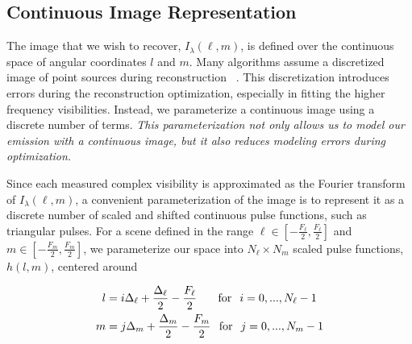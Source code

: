 \subsection{Continuous Image Representation}


The image that we wish to recover, $I_{\lambda}(\ell,m)$, is defined over the continuous space of angular coordinates $l$ and $m$. 
Many algorithms assume a discretized image of point sources during reconstruction 
~\cite{taylor1999synthesis}. This discretization introduces errors during the reconstruction optimization, especially in fitting the higher frequency visibilities.
Instead, we parameterize a continuous image using a discrete number of terms. 
{\it This parameterization not only allows us to model our emission with a continuous image, but it also reduces modeling errors during optimization. }

Since each measured complex visibility is approximated as the Fourier transform of $I_{\lambda}(\ell,m)$, a convenient parameterization of the image is to represent it as a discrete number of scaled and shifted continuous pulse functions, such as triangular pulses.
For a scene defined in the range $\ell \in [-\frac{F_\ell}{2}, \frac{F_\ell}{2}]$ and $m \in [-\frac{F_m}{2}, \frac{F_m}{2}]$,
we parameterize our space into $N_\ell \times N_m$ scaled pulse functions, $h(l,m)$, centered around 


\begin{align}
 l &= i \Delta_{\ell} + \frac{\Delta_{\ell}}{2}  -\frac{F_\ell}{2} \hspace{0.26in} \mbox{for} \hspace{0.1 in} i = 0,...,N_\ell-1
 \label{eq:discrete1}
\\m &= j\Delta_m + \frac{\Delta_m}{2} -\frac{F_m}{2} \hspace{0.1in} \mbox{for} \hspace{0.1 in} j= 0,...,N_m-1
\label{eq:discrete2}
\end{align} 


